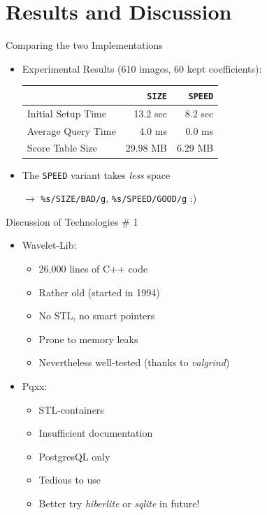 \documentclass{beamer}
\newcommand\rarrow{$\longrightarrow$ } %
\begin{document}
\section{Results and Discussion}

\begin{frame}{Comparing the two Implementations}

  \begin{itemize}
    \item Experimental Results (610 images, 60 kept coefficients):
      \begin{center}
        \begin{tabular}{|l|r|r|}\hline
          ~ & \texttt{SIZE} & \texttt{SPEED} \\ \hline\hline
          Initial Setup Time & 13.2 sec & 8.2 sec \\ \hline
          Average Query Time & 4.0 ms  & 0.0 ms \\ \hline
          Score Table Size & 29.98 MB  & 6.29 MB \\ \hline
        \end{tabular}
      \end{center}
      \medskip

        \pause
      \item The \texttt{SPEED} variant takes \emph{less} space

        \pause
        \rarrow \texttt{\%s/SIZE/BAD/g}\pause, \texttt{\%s/SPEED/GOOD/g} \pause :)

  \end{itemize}

\end{frame}

\begin{frame}{Discussion of Technologies \# 1}

  \begin{itemize}
  \item Wavelet-Lib:
    \begin{itemize}
    \item 26,000 lines of C++ code
    \item Rather old (started in 1994)
    \item No STL, no smart pointers
    \item Prone to memory leaks
    \item Nevertheless well-tested (thanks to \emph{valgrind})
    \end{itemize}
    \pause
  \item Pqxx:
    \begin{itemize}
    \item STL-containers
    \item Insufficient documentation
    \item PostgresQL only
    \item Tedious to use
    \item Better try \emph{hiberlite} or \emph{sqlite} in future!
    \end{itemize}
  \end{itemize}
  
\end{frame}
\end{document}
